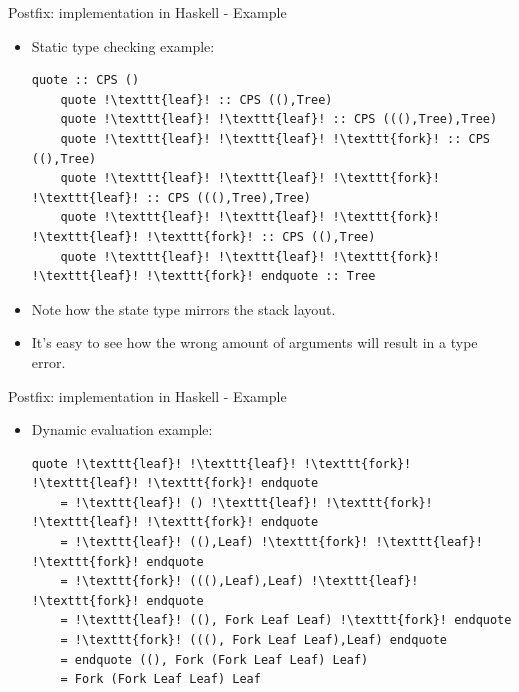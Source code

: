 \documentclass[10pt]{beamer}
\begin{document}
\begin{frame}[fragile]{Postfix: implementation in Haskell - Example}

\begin{itemize}

\item Static type checking example:

\begin{lstlisting}[mathescape=true, escapechar=!]
	quote :: CPS ()
	quote !\texttt{leaf}! :: CPS ((),Tree)
	quote !\texttt{leaf}! !\texttt{leaf}! :: CPS (((),Tree),Tree)
	quote !\texttt{leaf}! !\texttt{leaf}! !\texttt{fork}! :: CPS ((),Tree)
	quote !\texttt{leaf}! !\texttt{leaf}! !\texttt{fork}! !\texttt{leaf}! :: CPS (((),Tree),Tree)
	quote !\texttt{leaf}! !\texttt{leaf}! !\texttt{fork}! !\texttt{leaf}! !\texttt{fork}! :: CPS ((),Tree)
	quote !\texttt{leaf}! !\texttt{leaf}! !\texttt{fork}! !\texttt{leaf}! !\texttt{fork}! endquote :: Tree
\end{lstlisting}

\item Note how the state type mirrors the stack layout.
\item It's easy to see how the wrong amount of arguments will result in a type error.

\end{itemize}

\end{frame}

\begin{frame}[fragile]{Postfix: implementation in Haskell - Example}

\begin{itemize}

\item Dynamic evaluation example:

\begin{lstlisting}[mathescape=true, escapechar=!]
	quote !\texttt{leaf}! !\texttt{leaf}! !\texttt{fork}! !\texttt{leaf}! !\texttt{fork}! endquote
	= !\texttt{leaf}! () !\texttt{leaf}! !\texttt{fork}! !\texttt{leaf}! !\texttt{fork}! endquote
	= !\texttt{leaf}! ((),Leaf) !\texttt{fork}! !\texttt{leaf}! !\texttt{fork}! endquote
	= !\texttt{fork}! (((),Leaf),Leaf) !\texttt{leaf}! !\texttt{fork}! endquote
	= !\texttt{leaf}! ((), Fork Leaf Leaf) !\texttt{fork}! endquote
	= !\texttt{fork}! (((), Fork Leaf Leaf),Leaf) endquote
	= endquote ((), Fork (Fork Leaf Leaf) Leaf)
	= Fork (Fork Leaf Leaf) Leaf
\end{lstlisting}

\end{itemize}

\end{frame}
\end{document}
